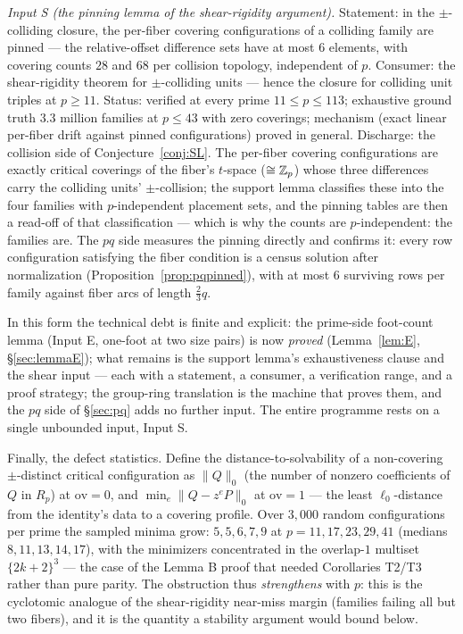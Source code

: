 \emph{Input S (the pinning lemma of the shear-rigidity argument).}
Statement: in the $\pm$-colliding closure, the per-fiber covering
configurations of a colliding family are pinned --- the relative-offset
difference sets have at most $6$ elements, with covering counts $28$ and
$68$ per collision topology, independent of $p$. Consumer: the
shear-rigidity theorem for $\pm$-colliding units --- hence the closure for
colliding unit triples at $p\ge11$. Status: verified at every prime
$11\le p\le113$; exhaustive ground truth $3.3$ million families at $p\le43$
with zero coverings; mechanism (exact linear per-fiber drift against
pinned configurations) proved in general. Discharge: the collision side of
Conjecture~\ref{conj:SL}. The per-fiber covering configurations are exactly
critical coverings of the fiber's $t$-space ($\cong\mathbb{Z}_p$) whose three
differences carry the colliding units' $\pm$-collision; the support lemma
classifies these into the four families with $p$-independent placement
sets, and the pinning tables are then a read-off of that classification ---
which is why the counts are $p$-independent: the families are. The $pq$
side measures the pinning directly and confirms it: every row configuration
satisfying the fiber condition is a census solution after normalization
(Proposition~\ref{prop:pqpinned}), with at most $6$ surviving rows per
family against fiber arcs of length $\tfrac23 q$.

In this form the technical debt is finite and explicit: the prime-side
foot-count lemma (Input E, one-foot at two size pairs) is now \emph{proved}
(Lemma~\ref{lem:E}, \S\ref{sec:lemmaE}); what remains is the support
lemma's exhaustiveness clause and the shear input --- each with a
statement, a consumer, a verification range, and a proof strategy; the
group-ring translation is the machine that proves them, and the $pq$ side
of \S\ref{sec:pq} adds no further input. The entire
programme rests on a single unbounded input, Input S.

\medskip
Finally, the defect statistics. Define the distance-to-solvability of a
non-covering $\pm$-distinct critical configuration as $\|Q\|_{0}$ (the
number of nonzero coefficients of $Q$ in $R_p$) at $\mathrm{ov}=0$, and
$\min_e\|Q-z^eP\|_{0}$ at $\mathrm{ov}=1$ --- the least $\ell_0$-distance
from the identity's data to a covering profile. Over $3{,}000$ random
configurations per prime the sampled minima grow: $5,5,6,7,9$ at
$p=11,17,23,29,41$ (medians $8,11,13,14,17$), with the minimizers
concentrated in the overlap-$1$ multiset $\{2k{+}2\}^3$ --- the case of the
Lemma B proof that needed Corollaries T2/T3 rather than pure parity. The
obstruction thus \emph{strengthens} with $p$: this is the cyclotomic
analogue of the shear-rigidity near-miss margin (families failing all but
two fibers), and it is the quantity a stability argument would bound below.


